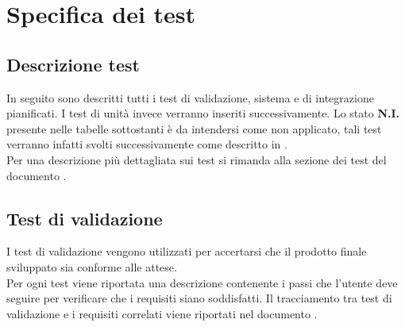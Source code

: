 %



\section{Specifica dei test}
	\subsection{Descrizione test}
		In seguito sono descritti tutti i test di validazione, sistema e di integrazione pianificati. I test di unità invece verranno inseriti successivamente.
Lo stato \textbf{N.I.} presente nelle tabelle sottostanti è da intendersi come non applicato, tali test verranno infatti svolti successivamente come descritto in \docNameVersionPdP.\\
Per una descrizione più dettagliata sui test si rimanda alla sezione dei test del documento \docNameVersionNdP.

\subsection{Test di validazione}
		I test di validazione vengono utilizzati per accertarsi che il prodotto finale sviluppato sia conforme alle attese.\\
		Per ogni test viene riportata una descrizione contenente i passi che l'utente deve seguire per verificare che i requisiti siano soddisfatti. Il tracciamento tra test di validazione e i requisiti correlati viene riportati nel documento \docNameVersionAdR.
		
